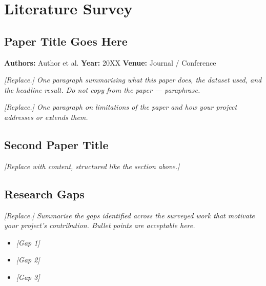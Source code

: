 
\chapter{Literature Survey}
\label{ch:literature}

\section{Paper Title Goes Here}
\label{sec:lit-paperA}

\textbf{Authors:} Author et al. \quad \textbf{Year:} 20XX \quad
\textbf{Venue:} Journal / Conference

\textit{[Replace.] One paragraph summarising what this paper does, the
dataset used, and the headline result. Do not copy from the paper — paraphrase.}

\textit{[Replace.] One paragraph on limitations of the paper and how your
project addresses or extends them.}


\section{Second Paper Title}
\label{sec:lit-paperB}

\textit{[Replace with content, structured like the section above.]}

\section{Research Gaps}
\label{sec:lit-gaps}

\textit{[Replace.] Summarise the gaps identified across the surveyed work
that motivate your project's contribution. Bullet points are acceptable here.}

\begin{itemize}
  \item \textit{[Gap 1]}
  \item \textit{[Gap 2]}
  \item \textit{[Gap 3]}
\end{itemize}
